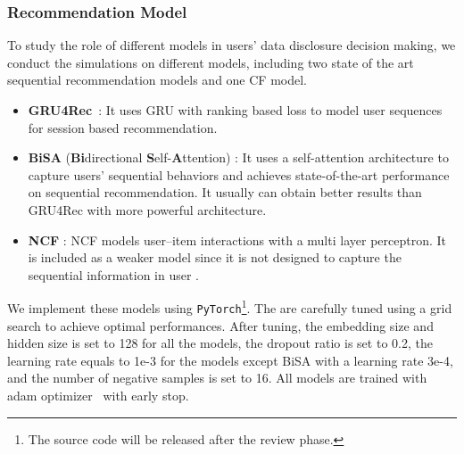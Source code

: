 \subsubsection{Recommendation Model}
To study the role of different models in users' data disclosure decision making, we conduct the simulations on different models, including two state of the art sequential recommendation models  and one CF model.
\begin{itemize}
    \item \textbf{GRU4Rec}~\cite{Hidasi:ICLR2016:gru4rec}: It uses GRU with ranking based loss to model user sequences for session based recommendation. 
    \item \textbf{BiSA} (\textbf{Bi}directional \textbf{S}elf-\textbf{A}ttention) \cite{kang2018self,Sun:cikm19:BERT4Rec}: It uses a self-attention architecture to capture users’ sequential behaviors and  achieves state-of-the-art performance on sequential recommendation. It usually can obtain better results than GRU4Rec with more powerful architecture.
    \item \textbf{NCF} \cite{NCF}: NCF models user–item interactions with a multi layer perceptron. It is included as a weaker model since it is not designed to capture the sequential information in user .
\end{itemize}

We implement these models using \texttt{PyTorch}\footnote{The source code will be released after the review phase.}.
The  are carefully tuned using a grid search to achieve optimal performances.
After tuning, the embedding size and hidden size is set to 128 for all the models, the dropout ratio is set to 0.2, the learning rate equals to 1e-3 for the models except BiSA with a learning rate 3e-4, and the number of negative samples is set to 16.
All models are trained with adam optimizer~\cite{kingma2015adam} with early stop.

